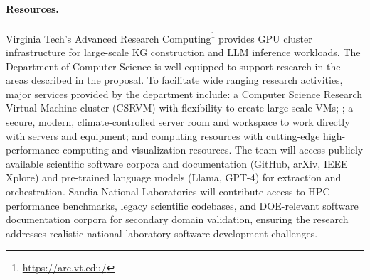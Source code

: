 \documentclass{files/proposalnsf}
\begin{document}
\paragraph{Resources.} Virginia Tech's Advanced Research Computing\footnote{\url{https://arc.vt.edu/}} provides GPU cluster infrastructure for large-scale KG construction and LLM inference workloads. The Department of Computer Science is well equipped to support research in the areas described in the proposal. To facilitate wide ranging research activities, major services provided by the department include: a Computer Science Research Virtual Machine cluster (CSRVM) with flexibility to create large scale VMs; ; a secure, modern, climate-controlled server room and workspace to work directly with servers and equipment; and computing resources with cutting-edge high-performance computing and visualization resources. The team will access publicly available scientific software corpora and documentation (\eg GitHub, arXiv, IEEE Xplore) and pre-trained language models (\eg Llama, GPT-4) for extraction and orchestration. Sandia National Laboratories will contribute access to HPC performance benchmarks, legacy scientific codebases, and DOE-relevant software documentation corpora for secondary domain validation, ensuring the research addresses realistic national laboratory software development challenges.



\end{document}

